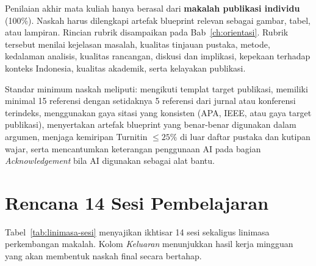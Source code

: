 Penilaian akhir mata kuliah hanya berasal dari \textbf{makalah publikasi
individu} (100\%). Naskah harus dilengkapi artefak blueprint relevan sebagai
gambar, tabel, atau lampiran. Rincian rubrik disampaikan pada
Bab~\ref{ch:orientasi}. Rubrik tersebut menilai kejelasan masalah, kualitas
tinjauan pustaka, metode, kedalaman analisis, kualitas rancangan, diskusi dan
implikasi, kepekaan terhadap konteks Indonesia, kualitas akademik, serta
kelayakan publikasi.

Standar minimum naskah meliputi: mengikuti templat target publikasi, memiliki
minimal 15 referensi dengan setidaknya 5 referensi dari jurnal atau konferensi
terindeks, menggunakan gaya sitasi yang konsisten (APA, IEEE, atau gaya
target publikasi), menyertakan artefak blueprint yang benar-benar digunakan
dalam argumen, menjaga kemiripan Turnitin $\leq 25\%$ di luar daftar pustaka
dan kutipan wajar, serta mencantumkan keterangan penggunaan AI pada bagian
\emph{Acknowledgement} bila AI digunakan sebagai alat bantu.

\section{Rencana 14 Sesi Pembelajaran}

Tabel~\ref{tab:linimasa-sesi} menyajikan ikhtisar 14 sesi sekaligus linimasa
perkembangan makalah. Kolom \emph{Keluaran} menunjukkan hasil kerja mingguan
yang akan membentuk naskah final secara bertahap.

